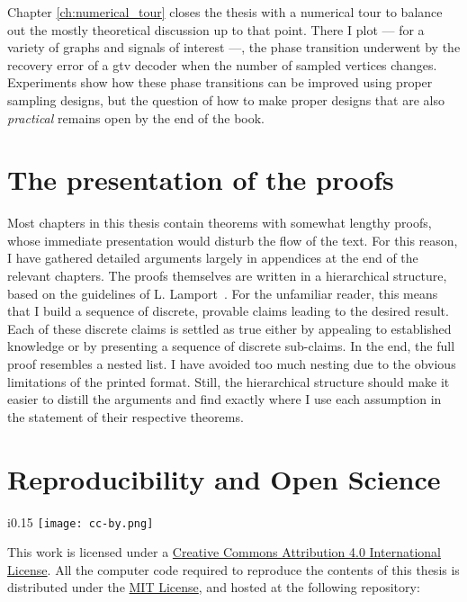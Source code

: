 Chapter \ref{ch:numerical_tour} closes the thesis with a numerical tour to balance out the mostly theoretical discussion up to that point. There I plot --- for a variety of graphs and signals of interest ---, the phase transition underwent by the recovery error of a \acrshort{gtv} decoder when the number of sampled vertices changes. Experiments show how these phase transitions can be improved using proper sampling designs, but the question of how to make proper designs that are also \emph{practical} remains open by the end of the book.

\section{The presentation of the proofs}

Most chapters in this thesis contain theorems with somewhat lengthy proofs, whose immediate presentation would disturb the flow of the text. For this reason, I have gathered detailed arguments largely in appendices at the end of the relevant chapters. The proofs themselves are written in a hierarchical structure, based on the guidelines of L. Lamport~\cite{lamport2012}. For the unfamiliar reader, this means that I build a sequence of discrete, provable claims leading to the desired result. Each of these discrete claims is settled as true either by appealing to established knowledge or by presenting a sequence of discrete sub-claims. In the end, the full proof resembles a nested list. I have avoided too much nesting due to the obvious limitations of the printed format. Still, the hierarchical structure should make it easier to distill the arguments and find exactly where I use each assumption in the statement of their respective theorems.

\section{Reproducibility and Open Science}

\begin{minipage}{\textwidth}
    {%
    \setlength\intextsep{0pt}
        \begin{wrapfigure}{i}{0.15\textwidth}
            \texttt{[image: cc-by.png]}
        \end{wrapfigure}
    \noindent This work is licensed under a \href{http://creativecommons.org/licenses/by/4.0/}{Creative Commons Attribution 4.0 International License}. All the computer code required to reproduce the contents of this thesis is distributed under the \href{https://opensource.org/licenses/MIT}{MIT License}, and hosted at the following repository:
    \begin{center}
    \end{center}%
    }
\end{minipage}
